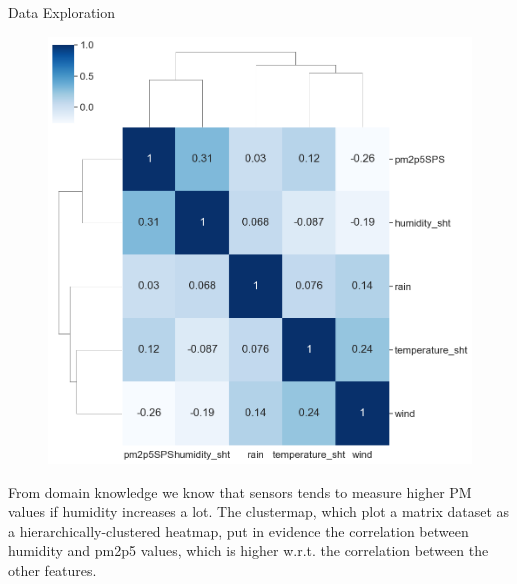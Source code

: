 \documentclass[10pt]{beamer}
\theoremstyle{remark}
\theoremstyle{definition}
\begin{document}
\begin{frame}{Data Exploration}
    \begin{figure}
        \includegraphics[scale=0.2]{correlation.png}
    \end{figure}
 From domain knowledge we know that sensors tends to measure higher PM values if humidity increases a lot. The clustermap, which plot a matrix dataset as a hierarchically-clustered heatmap, put in evidence the correlation between humidity and pm2p5 values, which is higher w.r.t. the correlation between the other features. 
\end{frame}
\end{document}
